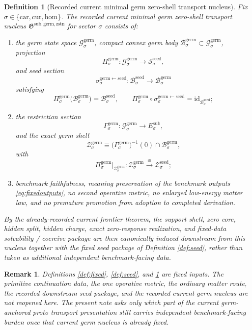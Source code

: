 \documentclass[11pt]{article}
\newcommand{\Car}{\mathrm{car}}
\newcommand{\Cur}{\mathrm{cur}}
\newcommand{\Hom}{\mathrm{hom}}
\newcommand{\SubTarget}[1]{E_{#1}^{\mathrm{sub}}}
\newcommand{\SeedState}[1]{\mathcal S_{#1}^{\mathrm{seed}}}
\newcommand{\SeedBody}[1]{\mathcal B_{#1}^{\mathrm{seed}}}
\newcommand{\SeedShell}[1]{\mathcal Z_{#1}^{\mathrm{seed}}}
\newcommand{\GermNucleus}{\mathfrak G^{\mathrm{sub,germ,zstn}}}
\newcommand{\GermState}[1]{\mathcal G_{#1}^{\mathrm{germ}}}
\newcommand{\GermBody}[1]{\mathcal B_{#1}^{\mathrm{germ}}}
\newcommand{\GermProj}[1]{\Pi_{#1}^{\mathrm{germ}}}
\newcommand{\GermSeedSec}[1]{\sigma_{#1}^{\mathrm{germ\leftarrow seed}}}
\newcommand{\GermSection}[1]{\Gamma_{#1}^{\mathrm{germ}}}
\newcommand{\GermShell}[1]{\mathcal Z_{#1}^{\mathrm{germ}}}
\newtheorem{definition}{Definition}
\newtheorem{remark}{Remark}
\begin{document}
\begin{definition}[Recorded current minimal germ zero-shell transport nucleus]
\label{def:nucleus}
Fix \(\sigma\in\{\Car,\Cur,\Hom\}\). The recorded current minimal germ zero-shell transport nucleus \(\GermNucleus\) for sector \(\sigma\) consists of:
\begin{enumerate}
    \item the germ state space \(\GermState{\sigma}\), compact convex germ body \(\GermBody{\sigma}\subset\GermState{\sigma}\), projection
    \[
    \GermProj{\sigma}:\GermState{\sigma}\to\SeedState{\sigma},
    \]
    and seed section
    \[
    \GermSeedSec{\sigma}:\SeedBody{\sigma}\to\GermBody{\sigma}
    \]
    satisfying
    \[
    \GermProj{\sigma}\bigl(\GermBody{\sigma}\bigr)=\SeedBody{\sigma},
    \qquad
    \GermProj{\sigma}\circ\GermSeedSec{\sigma}
    =
    \mathrm{id}_{\SeedBody{\sigma}};
    \]
    \item the restriction section
    \[
    \GermSection{\sigma}:\GermState{\sigma}\to\SubTarget{\sigma},
    \]
    and the exact germ shell
    \[
    \GermShell{\sigma}
    \equiv
    \bigl(\GermSection{\sigma}\bigr)^{-1}(0)\cap\GermBody{\sigma},
    \]
    with
    \[
    \GermProj{\sigma}\big|_{\GermShell{\sigma}}
    :
    \GermShell{\sigma}
    \xrightarrow{\cong}
    \SeedShell{\sigma};
    \]
    \item benchmark faithfulness, meaning preservation of the benchmark outputs \eqref{eq:fixedoutputs}, no second operative metric, no enlarged low-energy matter law, and no premature promotion from adoption to completed derivation.
\end{enumerate}
By the already-recorded current frontier theorem, the support shell, zero core, hidden split, hidden charge, exact zero-response realization, and fixed-data solvability / coercive package are then canonically induced downstream from this nucleus together with the fixed seed package of Definition \ref{def:seed}, rather than taken as additional independent benchmark-facing data.
\end{definition}

\begin{remark}
Definitions \ref{def:fixed}, \ref{def:seed}, and \ref{def:nucleus} are fixed inputs. The primitive continuation data, the one operative metric, the ordinary matter route, the recorded downstream seed package, and the recorded current germ nucleus are not reopened here. The present note asks only which part of the current germ-anchored proto transport presentation still carries independent benchmark-facing burden once that current germ nucleus is already fixed.
\end{remark}
\end{document}
